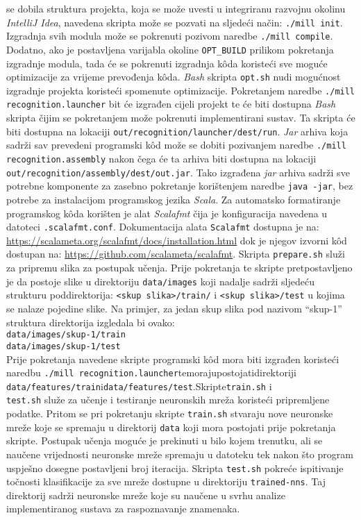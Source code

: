 se dobila struktura projekta, koja se može uvesti u integriranu razvojnu okolinu \emph{IntelliJ Idea}, navedena skripta
može se pozvati na sljedeći način: \texttt{./mill init}. Izgradnja svih modula može se pokrenuti pozivom naredbe
\texttt{./mill compile}. Dodatno, ako je postavljena varijabla okoline \texttt{OPT\_BUILD} prilikom pokretanja izgradnje
modula, tada će se pokrenuti izgradnja kôda koristeći sve moguće optimizacije za vrijeme prevođenja kôda. \emph{Bash}
skripta \texttt{opt.sh} nudi mogućnost izgradnje projekta koristeći spomenute optimizacije. Pokretanjem naredbe
\texttt{./mill recognition.launcher} bit će izgrađen cijeli projekt te će biti dostupna \emph{Bash} skripta čijim se
pokretanjem može pokrenuti implementirani sustav. Ta skripta će biti dostupna na lokaciji
\texttt{out/recognition/launcher/dest/run}. \emph{Jar} arhiva koja sadrži sav prevedeni programski kôd može se dobiti
pozivanjem naredbe \texttt{./mill recognition.assembly} nakon čega će ta arhiva biti dostupna na lokaciji
\texttt{out/recognition/assembly/dest/out.jar}. Tako izgrađena \emph{jar} arhiva sadrži sve potrebne komponente za
zasebno pokretanje korištenjem naredbe \texttt{java -jar}, bez potrebe za instalacijom programskog jezika \emph{Scala}.
Za automatsko formatiranje programskog kôda korišten je alat \emph{Scalafmt} čija je konfiguracija navedena u datoteci
\texttt{.scalafmt.conf}. Dokumentacija alata \texttt{Scalafmt} dostupna je na:
\url{https://scalameta.org/scalafmt/docs/installation.html} dok je njegov izvorni kôd dostupan na:
\url{https://github.com/scalameta/scalafmt}. Skripta \texttt{prepare.sh} služi za pripremu slika za postupak učenja.
Prije pokretanja te skripte pretpostavljeno je da postoje slike u direktoriju \texttt{data/images} koji nadalje sadrži
sljedeću strukturu poddirektorija: \texttt{<skup slika>/train/} i \texttt{<skup slika>/test} u kojima se nalaze pojedine
slike. Na primjer, za jedan skup slika pod nazivom ``skup-1'' struktura direktorija izgledala bi ovako:\\
\texttt{data/images/skup-1/train}\\
\texttt{data/images/skup-1/test}\\
Prije pokretanja navedene skripte programski kôd mora biti izgrađen koristeći naredbu\hfill{}
\texttt{./mill recognition.launcher}\hfill{}te\hfill{}moraju\hfill{}postojati\hfill{}direktoriji\\
\texttt{data/features/train}\hfill{}i\hfill{}\texttt{data/features/test}.\hfill{}Skripte\hfill{}\texttt{train.sh}
\hfill{}i\\\texttt{test.sh} služe za učenje i testiranje neuronskih mreža koristeći pripremljene podatke. Pritom se pri
pokretanju skripte \texttt{train.sh} stvaraju nove neuronske mreže koje se spremaju u direktorij \texttt{data} koji mora
postojati prije pokretanja skripte. Postupak učenja moguće je prekinuti u bilo kojem trenutku, ali se naučene
vrijednosti neuronske mreže spremaju u datoteku tek nakon što program uspješno dosegne postavljeni broj iteracija.
Skripta \texttt{test.sh} pokreće ispitivanje točnosti klasifikacije za sve mreže dostupne u direktoriju
\texttt{trained-nns}. Taj direktorij sadrži neuronske mreže koje su naučene u svrhu analize implementiranog sustava za
raspoznavanje znamenaka.
